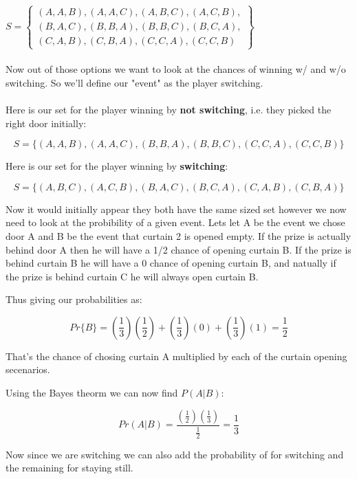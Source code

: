 \documentclass{article}
\begin{document}
\begin{enumerate}
    \begin{math} S =
      \left\{
        \begin{array}{l}
          (A,A,B),(A,A,C),(A,B,C),(A,C,B), \\
          (B,A,C),(B,B,A),(B,B,C),(B,C,A), \\
          (C,A,B),(C,B,A),(C,C,A),(C,C,B)
        \end{array}
      \right\}
    \end{math} \\\\
    
    Now out of those options we want to look at the chances of winning w/ and w/o switching. So we'll define our "event" as the player switching. \\\\
    
    Here is our set for the player winning by \textbf{not switching}, i.e. they picked the right door initially:
    
    \[S = \{(A,A,B),(A,A,C),(B,B,A),(B,B,C),(C,C,A),(C,C,B)\}\]

    Here is our set for the player winning by \textbf{switching}:

    \[S = \{(A,B,C),(A,C,B),(B,A,C),(B,C,A),(C,A,B),(C,B,A)\}\]

    Now it would initially appear they both have the same sized set however we now need to look at the probibility of a given event. 
    Lets let A be the event we chose door A and B be the event that curtain 2 is opened empty.
    If the prize is actually behind door A then he will have a 1/2 chance of opening curtain B. If the prize is behind curtain B he will have a 0 chance of opening curtain B, and natually if the prize is behind curtain C he will always open curtain B.

    Thus giving our probabilities as:

    \[Pr\{B\} = (\frac{1}{3})(\frac{1}{2}) + (\frac{1}{3})(0) + (\frac{1}{3})(1) = \frac{1}{2}\]

    That's the chance of chosing curtain A multiplied by each of the curtain opening secenarios. 

    Using the Bayes theorm we can now find $P(A|B)$:

    \[Pr(A|B) = \frac{(\frac{1}{2})(\frac{1}{3})}{\frac{1}{2}} = \frac{1}{3}\]

    Now since we are switching we can also add the probability of  for switching and the remaining  for staying still.


\end{enumerate}
\end{document}
